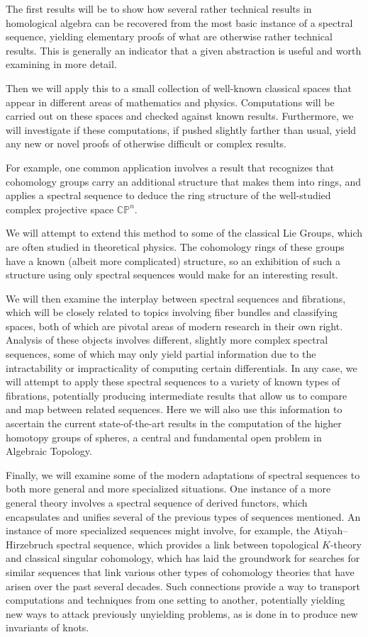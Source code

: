 \documentclass[normal]{aomart}
\newtheorem[{}\it]{thm}{Theorem}[section]
\theoremstyle{definition}
\newtheorem*[{}\it]{notation}{Notation}
\begin{document}
The first results will be to show how several rather technical results in homological algebra can be recovered from the most basic instance of a spectral sequence, yielding elementary proofs of what are otherwise rather technical results. This is generally an indicator that a given abstraction is useful and worth examining in more detail.

Then we will apply this to a small collection of well-known classical spaces that appear in different areas of mathematics and physics. Computations will be carried out on these spaces and checked against known results. Furthermore, we will investigate if these computations, if pushed slightly farther than usual, yield any new or novel proofs of otherwise difficult or complex results. 

For example, one common application involves a result that recognizes that cohomology groups carry an additional structure that makes them into rings, and applies a spectral sequence to deduce the ring structure of the well-studied complex projective space $\mathbb{CP}^n$. 

We will attempt to extend this method to some of the classical Lie Groups, which are often studied in theoretical physics. The cohomology rings of these groups have a known (albeit more complicated) structure, so an exhibition of such a structure using only spectral sequences would make for an interesting result.

We will then examine the interplay between spectral sequences and fibrations, which will be closely related to topics involving fiber bundles and classifying spaces, both of which are pivotal areas of modern research in their own right. Analysis of these objects involves different, slightly more complex spectral sequences, some of which may only yield partial information due to the intractability or impracticality of computing certain differentials. In any case, we will attempt to apply these spectral sequences to a variety of known types of fibrations, potentially producing intermediate results that allow us to compare and map between related sequences. Here we will also use this information to ascertain the current state-of-the-art results in the computation of the higher homotopy groups of spheres, a central and fundamental open problem in Algebraic Topology.

Finally, we will examine some of the modern adaptations of spectral sequences to both more general and more specialized situations. One instance of a more general theory involves a spectral sequence of derived functors, which encapsulates and unifies several of the previous types of sequences mentioned. An instance of more specialized sequences might involve, for example, the Atiyah–Hirzebruch spectral sequence, which provides a link between topological $K$-theory and classical singular cohomology, which has laid the groundwork for searches for similar sequences that link various other types of cohomology theories that have arisen over the past several decades.\cite{Grayson2005} Such connections provide a way to transport computations and techniques from one setting to another, potentially yielding new ways to attack previously unyielding problems, as is done in \cite{Batson2013} to produce new invariants of knots.
\end{document}
